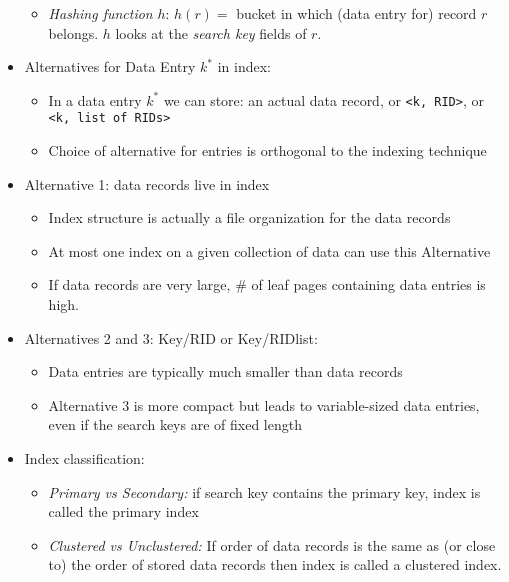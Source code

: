 \documentclass[landscape,8pt]{extarticle}
\newcommand{\code}{\lstinline}
\begin{document}
\begin{multicols}{5}
\begin{itemize}
\begin{itemize}
                  \item \emph{Hashing function} $h$: $h(r) = $ bucket in which (data entry for) record $r$ belongs. $h$ looks at the \emph{search key} fields of $r$.
              \end{itemize}
        \item Alternatives for Data Entry $k^*$ in index:
              \begin{itemize}
                  \item In a data entry $k^*$ we can store: an actual data record, or \code{<k, RID>}, or \code{<k, list of RIDs>}
                  \item Choice of alternative for entries is orthogonal to the indexing technique
              \end{itemize}
        \item Alternative 1: data records live in index
              \begin{itemize}
                  \item Index structure is actually a file organization for the data records
                  \item At most one index on a given collection of data can use this Alternative
                  \item If data records are very large, \# of leaf pages containing data entries is high.
              \end{itemize}
        \item Alternatives 2 and 3: Key/RID or Key/RIDlist:
              \begin{itemize}
                  \item Data entries are typically much smaller than data records
                  \item Alternative 3 is more compact but leads to variable-sized data entries, even if the search keys are of fixed length
              \end{itemize}
        \item Index classification:
              \begin{itemize}
                  \item \emph{Primary vs Secondary:} if search key contains the primary key, index is called the primary index
                  \item \emph{Clustered vs Unclustered:} If order of data records is the same as (or close to) the order of stored data records then index is called a clustered index.
              \end{itemize}

\end{itemize}
\end{multicols}
\end{document}
